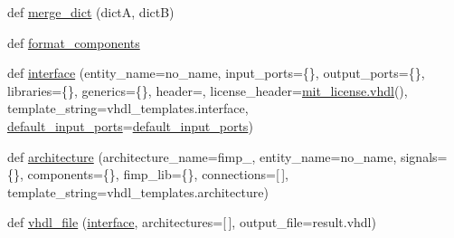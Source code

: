 \begin{DoxyCompactItemize}
def \hyperlink{namespacesylva_1_1code__generation_1_1vhdl__generation_a6f105e19192ce75934f22be90308ceff}{merge\+\_\+dict} (dictA, dictB)
\item 
def \hyperlink{namespacesylva_1_1code__generation_1_1vhdl__generation_a82d14f967dd9f7e059172186c5b49411}{format\+\_\+components}
\item 
def \hyperlink{namespacesylva_1_1code__generation_1_1vhdl__generation_a4807ba4c1479ad348e96412049260431}{interface} (entity\+\_\+name=\textquotesingle{}no\+\_\+name\textquotesingle{}, input\+\_\+ports=\{\}, output\+\_\+ports=\{\}, libraries=\{\}, generics=\{\}, header=\textquotesingle{}\textquotesingle{}, license\+\_\+header=\hyperlink{namespacesylva_1_1code__generation_1_1mit__license_a5c8d9ae3b2d4db392cdc66e37b035675}{mit\+\_\+license.\+vhdl}(), template\+\_\+string=vhdl\+\_\+templates.\+interface, \hyperlink{namespacesylva_1_1code__generation_1_1vhdl__generation_a0cf71880063e2c29029ca74b630eec28}{default\+\_\+input\+\_\+ports}=\hyperlink{namespacesylva_1_1code__generation_1_1vhdl__generation_a0cf71880063e2c29029ca74b630eec28}{default\+\_\+input\+\_\+ports})
\item 
def \hyperlink{namespacesylva_1_1code__generation_1_1vhdl__generation_a94219128d04fd81a78200424dbf45356}{architecture} (architecture\+\_\+name=\textquotesingle{}fimp\+\_\textquotesingle{}, entity\+\_\+name=\textquotesingle{}no\+\_\+name\textquotesingle{}, signals=\{\}, components=\{\}, fimp\+\_\+lib=\{\}, connections=\mbox{[}$\,$\mbox{]}, template\+\_\+string=vhdl\+\_\+templates.\+architecture)
\item 
def \hyperlink{namespacesylva_1_1code__generation_1_1vhdl__generation_ae2d3d4cc47d3292a63a983c9645c3010}{vhdl\+\_\+file} (\hyperlink{namespacesylva_1_1code__generation_1_1vhdl__generation_a4807ba4c1479ad348e96412049260431}{interface}, architectures=\mbox{[}$\,$\mbox{]}, output\+\_\+file=\textquotesingle{}result.\+vhdl\textquotesingle{})
\end{DoxyCompactItemize}
